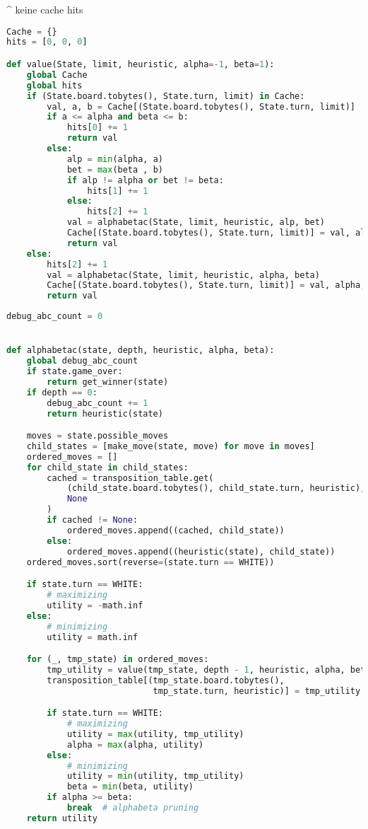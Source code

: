 \^{} keine cache hits

\begin{lstlisting}[language=Python]
Cache = {}
hits = [0, 0, 0]

def value(State, limit, heuristic, alpha=-1, beta=1):
    global Cache
    global hits
    if (State.board.tobytes(), State.turn, limit) in Cache:
        val, a, b = Cache[(State.board.tobytes(), State.turn, limit)]
        if a <= alpha and beta <= b:
            hits[0] += 1
            return val
        else:
            alp = min(alpha, a)
            bet = max(beta , b)
            if alp != alpha or bet != beta:
                hits[1] += 1
            else:
                hits[2] += 1
            val = alphabetac(State, limit, heuristic, alp, bet)
            Cache[(State.board.tobytes(), State.turn, limit)] = val, alp, bet
            return val
    else:
        hits[2] += 1
        val = alphabetac(State, limit, heuristic, alpha, beta)
        Cache[(State.board.tobytes(), State.turn, limit)] = val, alpha, beta
        return val
\end{lstlisting}

\begin{lstlisting}[language=Python]
debug_abc_count = 0


def alphabetac(state, depth, heuristic, alpha, beta):
    global debug_abc_count
    if state.game_over:
        return get_winner(state)
    if depth == 0:
        debug_abc_count += 1
        return heuristic(state)

    moves = state.possible_moves
    child_states = [make_move(state, move) for move in moves]
    ordered_moves = []
    for child_state in child_states:
        cached = transposition_table.get(
            (child_state.board.tobytes(), child_state.turn, heuristic),
            None
        )
        if cached != None:
            ordered_moves.append((cached, child_state))
        else:
            ordered_moves.append((heuristic(state), child_state))
    ordered_moves.sort(reverse=(state.turn == WHITE))

    if state.turn == WHITE:
        # maximizing
        utility = -math.inf
    else:
        # minimizing
        utility = math.inf

    for (_, tmp_state) in ordered_moves:
        tmp_utility = value(tmp_state, depth - 1, heuristic, alpha, beta)
        transposition_table[(tmp_state.board.tobytes(),
                             tmp_state.turn, heuristic)] = tmp_utility

        if state.turn == WHITE:
            # maximizing
            utility = max(utility, tmp_utility)
            alpha = max(alpha, utility)
        else:
            # minimizing
            utility = min(utility, tmp_utility)
            beta = min(beta, utility)
        if alpha >= beta:
            break  # alphabeta pruning
    return utility
\end{lstlisting}

